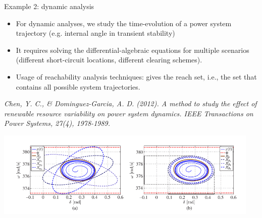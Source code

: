 \begin{frame}[allowframebreaks]{Example 2: dynamic analysis}
\begin{itemize}
    \item For dynamic analyses, we study the time-evolution of a power system trajectory (e.g. internal angle in transient stability)
    \item It requires solving the differential-algebraic equations for multiple scenarios (different short-circuit locations, different clearing schemes).
    \item Usage of reachability analysis techniques: gives the reach set, i.e., the set that contains all possible system trajectories.
\end{itemize}
\emph{Chen, Y. C., \& Dominguez-Garcia, A. D. (2012). A method to study the effect of renewable resource variability on power system dynamics. IEEE Transactions on Power Systems, 27(4), 1978-1989.}
\begin{center}
\includegraphics[width=0.95\textwidth]{images/ReachAn.png}
\end{center}
\end{frame}
